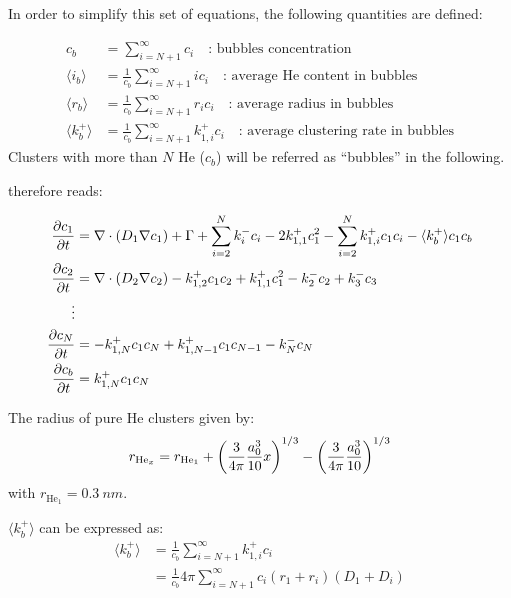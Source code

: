 In order to simplify this set of equations, the following quantities are defined:

\begin{align}
    c_b &= \sum\limits_{i=N+1}^\infty c_i \quad \text{: bubbles concentration} \\
    \langle i_b \rangle &= \frac{1}{c_b} \sum\limits_{i=N+1}^\infty i c_i \quad \text{: average He content in bubbles} \\
    \langle r_b \rangle &=  \frac{1}{c_b}\sum\limits_{i=N+1}^\infty r_i c_i \quad \text{: average radius in bubbles}\\
    \langle k_b^+ \rangle &=  \frac{1}{c_b}\sum\limits_{i=N+1}^\infty k_{1,i}^+ c_i \quad \text{: average clustering rate in bubbles}
\end{align}
Clusters with more than $N$ \gls{He} ($c_b$) will be referred as ``bubbles'' in the following.

 therefore reads:

\begin{subequations}
    \begin{align}
        \frac{\partial c_1}{\partial t} &= \nabla \cdot (D_1 \nabla c_1) + \Gamma + \sum\limits_{i=2}^N k_{i}^- c_i- 2k_{1, 1}^+ c_1^2 - \sum\limits_{i=2}^N k_{1,i}^+ c_1 c_i - \langle k_b^+ \rangle c_1 c_b \\
        \frac{\partial c_2}{\partial t} &= \nabla \cdot (D_2 \nabla c_2) - k_{1, 2}^+ c_1 c_2 + k_{1, 1}^+ c_1^2 - k_{2}^- c_2 + k_{3}^- c_3\\
        \vdots \nonumber\\
        \frac{\partial c_N}{\partial t} &= - k_{1, N}^+ c_1 c_N + k_{1, N-1}^+ c_1 c_{N-1} - k_{N}^- c_N\\
        \frac{\partial c_b}{\partial t} &= k_ {1,N}^+ c_1 c_N \\
    \end{align}
    \labeq{temporal evolution grouping}
\end{subequations}

The radius of pure \gls{He} clusters  given by:
\begin{equation}
    r_{\mathrm{He}_x} = r_{\mathrm{He}_1} + \left(\frac{3}{4\pi} \frac{a_0^3}{10} x \right)^{1/3} - \left( \frac{3}{4\pi} \frac{a_0^3}{10} \right)^{1/3}
    \labeq{radius pure He}
\end{equation}
with $r_{\mathrm{He}_1} = \SI{0.3}{nm}$.

$\langle k_b^+ \rangle$ can be expressed as:
\begin{subequations}
    \begin{align}
        \langle k_b^+ \rangle &= \frac{1}{c_b}\sum\limits_{i=N+1}^\infty k_{1,i}^+ c_i\\
        &= \frac{1}{c_b} 4 \pi \sum\limits_{i=N+1}^\infty c_i  (r_1 + r_i) (D_1 + D_i)
    \end{align}
\end{subequations}

